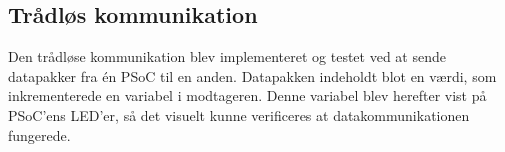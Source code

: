 \subsection{Trådløs kommunikation}

Den trådløse kommunikation blev implementeret og testet ved at sende datapakker fra én PSoC til en anden. Datapakken indeholdt blot en værdi, som inkrementerede en variabel i modtageren. Denne variabel blev herefter vist på PSoC'ens LED'er, så det visuelt kunne verificeres at datakommunikationen fungerede.

